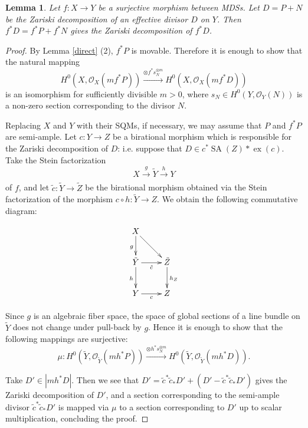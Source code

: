 \documentclass[12pt,twoside]{amsart}
\newtheorem{lem}[theo]{Lemma}
\theoremstyle{definition}
\newcommand\SA{\mathop{\mathrm{SA}}\nolimits}
\newcommand\ex{\mathop{\mathrm{ex}}}
\newcommand\OO{\mathcal{O}}
\begin{document}
\begin{lem}\label{ZD under pull-back}
Let $f:X\to Y$ be a surjective morphism between MDSs.
Let $D=P+N$ be the Zariski decomposition of an effective divisor $D$ on $Y$.
Then $f^{*}D=f^{*}P+f^{*}N$ gives the Zariski decomposition of $f^{*}D$.
\end{lem}
\begin{proof}
By Lemma \ref{direct} (2), $f^{*}P$ is movable. Therefore it is enough to show that
the natural mapping
\begin{equation*}
H^0(X,\OO_X(mf^{*}P))\xrightarrow[]{\otimes f^{*}s_N^{\otimes m}}H^0(X,\OO_X(mf^{*}D))
\end{equation*}
is an isomorphism for sufficiently divisible $m>0$, where $s_N\in H^0(Y,\OO_Y(N))$ is
a non-zero section corresponding to the divisor $N$.

Replacing $X$ and $Y$ with their SQMs, if necessary, we may assume that
$P$ and $f^{*}P$ are semi-ample. 
Let $c:Y\to Z$ be a birational morphism which is responsible for the Zariski decomposition
of $D$: i.e. suppose that $D\in c^{*}\SA{(Z)}*\ex{(c)}$. Take the Stein factorization
\begin{equation*}
X\xrightarrow[]{g}\tilde{Y}\xrightarrow[]{h}Y 
\end{equation*}
of $f$, and let $\tilde{c}:\tilde{Y}\to\tilde{Z}$ be the birational morphism obtained via the
Stein factorization of the morphism $c\circ h:\tilde{Y}\to Z$. We obtain the following commutative diagram:

\[
\xymatrix{
X \ar[rd] \ar[d]_{g} & \\
\tilde{Y} \ar[r]_{\tilde{c}} \ar[d]_{h} & \tilde{Z} \ar[d]^{h_Z} \\
Y \ar[r]_{c} & Z \\}\]

Since $g$ is an algebraic fiber space, the space of global sections of a line bundle on $\tilde{Y}$ does not change
under pull-back by $g$. Hence it is enough to show that the following mappings are
surjective:
\begin{equation*}
\mu:H^0(\tilde{Y},\OO_{\tilde{Y}}(mh^{*}P))\xrightarrow[]{\otimes h^{*}s_N^{\otimes m}}H^0(\tilde{Y},\OO_{\tilde{Y}}(mh^{*}D)).
\end{equation*}

Take $D'\in |mh^{*}D|$. Then we see that
$D'=\tilde{c}^{*}\tilde{c}_{*}D'+(D'-\tilde{c}^{*}\tilde{c}_{*}D')$ gives the Zariski decomposition of $D'$, and a
section corresponding to the semi-ample divisor $\tilde{c}^{*}\tilde{c}_{*}D'$ is mapped via $\mu$ to a section
corresponding to $D'$ up to scalar multiplication, concluding the proof.
\end{proof}
\end{document}
